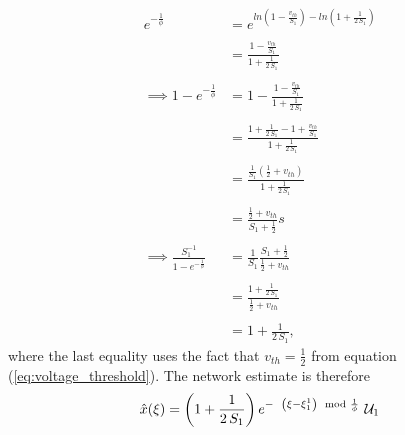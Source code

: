 \begin{enumerate}
\begin{align*}
e^
{
	-\frac
	{
		1
	}
	{
		\phi
	}
}
&= 
e^
{
	ln
	\left(
		1 - 
		\frac
		{
			v_{th}
		}
		{
			S_1	
		}
	\right)
	-
	ln
	\left(
			1 +
		\frac
		{
			1
		}
		{
			2 \, S_1	
		}	
	\right)
}
%
\\
\\
%
&= 
\frac
{
	1 - 
	\frac
	{
		v_{th}
	}
	{
		S_1	
	}
}
{
	1 +
	\frac
	{
		1
	}
	{
		2 \, S_1	
	}	
}
%
\\
\\
%
\implies
1 - e^
{
	-\frac
	{
		1
	}
	{
		\phi
	}
}
&= 
1 - 
\frac
{
	1 - 
	\frac
	{
		v_{th}
	}
	{
		S_1	
	}
}
{
	1 +
	\frac
	{
		1
	}
	{
		2 \, S_1	
	}	
}
%
\\
\\
%
&= 
\frac
{
	1 + 
	\frac
	{
		1
	}
	{
		2 \, S_1
	}
	-
	1 + 
	\frac
	{
		v_{th}
	}
	{
		S_1
	}
}
{
	1 + 
	\frac
	{
		1
	}
	{
		2 \, S_1
	}
}
%
\\
\\
%
&= 
\frac
{
	\frac
	{
		1
	}
	{
		S_1
	}
	\left(
		\frac
		{
			1
		}
		{
			2
		}
		+ v_{th}
	\right)	
}
{
	1 + 
	\frac
	{
		1
	}
	{
		2 \, S_1
	}
}
%
\\
\\
%
&= 
\frac
{
	\frac
	{
		1
	}
	{
		2
	}
	+ v_{th}
}
{
	S_1 + 
	\frac
	{
		1
	}
	{
		2
	}
}s
%
\\
\\
%
\implies 
\frac
{
	S_1^
	{
		-1
	}
}
{
	1 - e^
	{
		-\frac
		{
			1
		}
		{
			\phi
		}
	}
} 
&=
\frac
{
	1
}
{
	S_1
}
\frac
{
	S_1 + 
	\frac
	{
		1
	}
	{
		2
	}
}
{
	\frac
	{
		1
	}
	{
		2
	}
	+ v_{th}
}
%
\\
\\
%
&= 
\frac
{
	1 + 
	\frac
	{
		1		
	}
	{
		2 \, S_1
	}
}
{
	\frac
	{
		1
	}
	{
		2
	}
	+
	v_{th}
}
%
\\
\\
%
&= 
1 +
\frac
{
	1
}
{
	2 \, S_1
}
, 
\end{align*}
where the last equality uses the fact that $v_{th} = \frac{1}{2}$ from equation (\ref{eq:voltage_threshold}).  
The network estimate is therefore
\begin{equation}
\label{eq:analysis:constant_driving_constant_dynamics_estimate_equation_explicit}
\hat
{
	x
}
(
	\xi
)
= 
\left(
1 + 
\frac
{
	1
}
{
	2 \, S_1
}
\right)
e^
{
	- \hspace{2mm}
	\left(
		\xi - \xi_1^1
	\right)
	\mod
	{
		\frac
		{
			1
		}
		{
			\phi
		}
	}
}
\, \, \mathcal{U}_1
\end{equation}


\end{enumerate}
